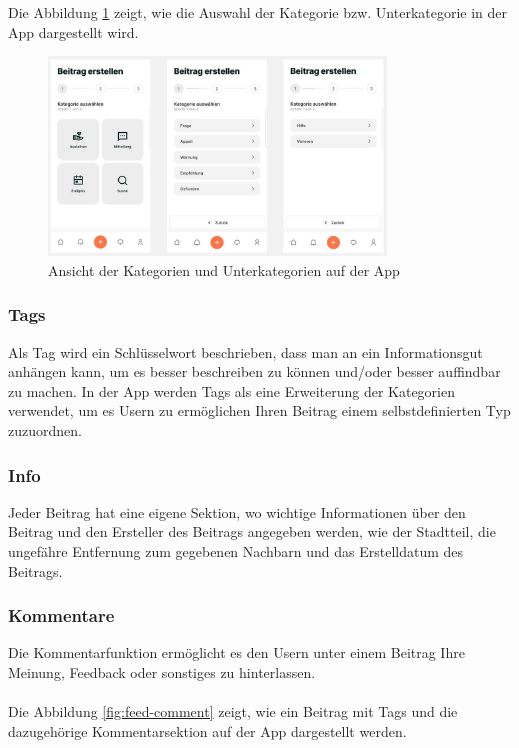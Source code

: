Die Abbildung \ref{fig:categories} zeigt, wie die Auswahl der Kategorie bzw. Unterkategorie in der App dargestellt wird.

\begin{figure}[H]
  \centering
  \includegraphics[width=0.8\textwidth]{pics/categories.JPG}
  \caption{Ansicht der Kategorien und Unterkategorien auf der App}
  \label{fig:categories}
\end{figure}


\subsubsection{Tags}
Als Tag wird ein Schlüsselwort beschrieben, dass man an ein Informationsgut anhängen kann, um es besser beschreiben zu können und/oder besser auffindbar zu machen. In der App werden Tags als eine Erweiterung der Kategorien verwendet, um es Usern zu ermöglichen Ihren Beitrag einem selbstdefinierten Typ zuzuordnen.

\subsubsection{Info}
Jeder Beitrag hat eine eigene Sektion, wo wichtige Informationen über den Beitrag und den Ersteller des Beitrags angegeben werden, wie der Stadtteil, die ungefähre Entfernung zum gegebenen Nachbarn und das Erstelldatum des Beitrags.

\subsubsection{Kommentare}
Die Kommentarfunktion ermöglicht es den Usern unter einem Beitrag Ihre Meinung, Feedback oder sonstiges zu hinterlassen.
\\\\
Die Abbildung \ref{fig:feed-comment} zeigt, wie ein Beitrag mit Tags und die dazugehörige Kommentarsektion auf der App dargestellt werden.

